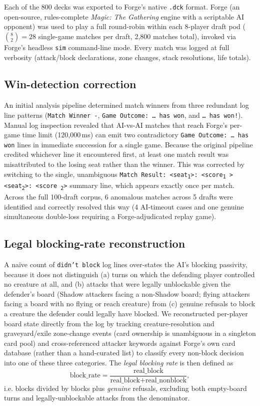 \documentclass[11pt]{article}
\begin{document}
Each of the 800 decks was exported to Forge's native \texttt{.dck} format. Forge (an
open-source, rules-complete \emph{Magic: The Gathering} engine with a scriptable AI
opponent) was used to play a full round-robin within each 8-player draft pod
(\(\binom{8}{2}=28\) single-game matches per draft, 2{,}800 matches total), invoked
via Forge's headless \texttt{sim} command-line mode. Every match was logged at full
verbosity (attack/block declarations, zone changes, stack resolutions, life totals).

\subsection{Win-detection correction}

An initial analysis pipeline determined match winners from three redundant log line
patterns (\texttt{Match Winner -}, \texttt{Game Outcome: \dots{} has won}, and
\texttt{\dots{} has won!}). Manual log inspection revealed that AI-vs-AI matches that
reach Forge's per-game time limit (120{,}000\,ms) can emit two contradictory
\texttt{Game Outcome: \dots{} has won} lines in immediate succession for a single
game. Because the original pipeline credited whichever line it encountered first, at
least one match result was misattributed to the losing seat rather than the winner.
This was corrected by switching to the single, unambiguous \texttt{Match Result:
\textless{}seat\textsubscript{1}\textgreater{}: \textless{}score\textsubscript{1}
\textgreater{} \textless{}seat\textsubscript{2}\textgreater{}: \textless{}score
\textsubscript{2}\textgreater{}} summary line, which appears exactly once per match.
Across the full 100-draft corpus, 6 anomalous matches across 5 drafts were identified
and correctly resolved this way (4 AI-timeout cases and one genuine simultaneous
double-loss requiring a Forge-adjudicated replay game).

\subsection{Legal blocking-rate reconstruction}

A na\"ive count of \texttt{didn't block} log lines over-states the AI's blocking
passivity, because it does not distinguish (a) turns on which the defending player
controlled no creature at all, and (b) attacks that were legally unblockable given the
defender's board (Shadow attackers facing a non-Shadow board; flying attackers facing
a board with no flying or reach creature) from (c) genuine refusals to block a
creature the defender could legally have blocked. We reconstructed per-player board
state directly from the log by tracking creature-resolution and graveyard/exile
zone-change events (card ownership is unambiguous in a singleton card pool) and
cross-referenced attacker keywords against Forge's own card database (rather than a
hand-curated list) to classify every non-block decision into one of these three
categories. The \emph{legal blocking rate} is then defined as
\[
  \text{block\_rate} = \frac{\text{real\_block}}{\text{real\_block} +
  \text{real\_nonblock}},
\]
i.e. blocks divided by blocks plus \emph{genuine} refusals, excluding both empty-board
turns and legally-unblockable attacks from the denominator.
\end{document}
